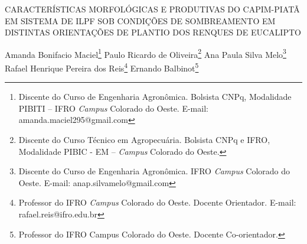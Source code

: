 \documentclass[article,12pt,onesidea,4paper,english,brazil]{abntex2}
\begin{document}
	
	
	\frenchspacing 
	
	\begin{center}
		\Large CARACTERÍSTICAS MORFOLÓGICAS E PRODUTIVAS DO CAPIM-PIATÃ EM
		SISTEMA DE ILPF SOB CONDIÇÕES DE SOMBREAMENTO EM DISTINTAS
		ORIENTAÇÕES DE PLANTIO DOS RENQUES DE EUCALIPTO
		
		\normalsize
		Amanda Bonifacio Maciel\footnote{Discente do Curso de Engenharia Agronômica. Bolsista CNPq, Modalidade PIBITI – IFRO \textit{Campus} Colorado do Oeste. E-mail: amanda.maciel295@gmail.com} 
		Paulo Ricardo de Oliveira\footnote{Discente do Curso Técnico em Agropecuária. Bolsista CNPq e IFRO, Modalidade PIBIC - EM – \textit{Campus} Colorado do Oeste.} 
		Ana Paula Silva Melo\footnote{Discente do Curso de Engenharia Agronômica. IFRO \textit{Campus} Colorado do Oeste. E-mail: anap.silvamelo@gmail.com} 
		Rafael Henrique Pereira dos Reis\footnote{Professor do IFRO \textit{Campus} Colorado do Oeste. Docente Orientador. E-mail: rafael.reis@ifro.edu.br}
		Ernando Balbinot\footnote{Professor do IFRO Campus Colorado do Oeste. Docente Co-orientador.} 
	\end{center}
	
\end{document}
